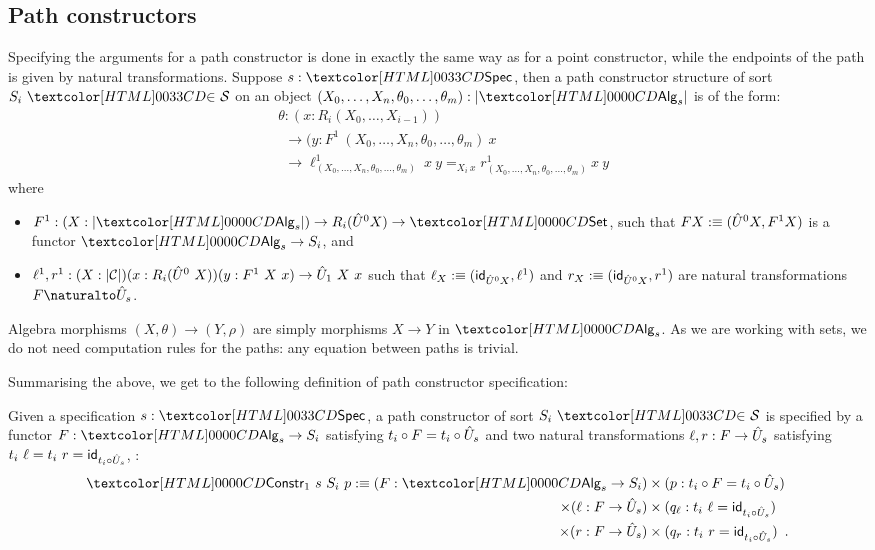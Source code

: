 \subsection{Path constructors}
\label{path-constructors}

Specifying the arguments for a path constructor is done in exactly the
same way as for a point constructor, while the endpoints of the path
is given by natural transformations. Suppose $s : \specty$, then a path
constructor structure of sort $\sortsin{S_i}{\Ss}$ on an object
$(X_0, \hdots, X_n, \theta_0,\hdots,\theta_m) : | \Alg_s |$ is of the
form:
\begin{align*}
  &\theta : (x : R_i (X_0, \hdots, X_{i-1})) \\
  &\ \ \to (y : F^1\ (X_0, \hdots, X_n, \theta_0, \hdots, \theta_m)\ x \\
  &\ \ \to \ell^1_{(X_0,\hdots,X_n,\theta_0,\hdots,\theta_m)}\ x\ y =_{X_i\ x} r^1_{(X_0,\hdots,X_n,\theta_0,\hdots,\theta_m)}\ x\ y 
\end{align*}
where
\begin{itemize}
\item $F^1 : (X : | \Alg_s |) \to R_i (\extendfunc{U}^0 X) \to \Set$, such
  that $F X :\equiv (\hat{U}^0 X, F^1 X)$ is a functor $\Alg_s \to S_i$, and
\item
  $\ell^1, r^1 : (X : | \mathcal{C} |) (x : R_i (\hat{U}^0\ X)) (y : F^1\ X\ x)
  \to \hat{U}_1\ X\ x$
  such that $\ell_X \ddefeq (\id_{\extendfunc{U}^0 X}, \ell^1)$ and
  $r_X \ddefeq (\id_{\extendfunc{U}^0 X}, r^1)$ are natural transformations
  $\Nat{F}{\extendfunc{U}_s}$.
\end{itemize}
Algebra morphisms $(X,\theta) \to (Y,\rho)$ are simply morphisms
$X \to Y$ in $\Alg_s$. As we are working with sets, we do not need
computation rules for the paths: any equation between paths is
trivial.

Summarising the above, we get to the following definition of
path constructor specification:

\begin{definition}
  Given a specification $s : \specty$, a path constructor of sort
  $\sortsin{S_i}{\Ss}$ is specified by a functor $F : \Alg_s \to S_i$
  satisfying $t_i \circ F = t_i \circ \hat{U}_s$ and two natural
  transformations $\ell, r : F \to \hat{U}_s$ satisfying
  $t_i\ \ell = t_i\ r = \id_{t_i \circ \extendfunc{U}_s}$, \ie:
\begin{align*}
  \Constr_1\ s\ S_i\ p \ddefeq (F : \Alg_s \to S_i) &\times (p : t_i \circ F = t_i \circ \extendfunc{U}_s) \\ 
  \times (\ell : F \to \extendfunc{U}_s) &\times (q_\ell : t_i\ \ell = \id_{t_i \circ \extendfunc{U}_s}) \\ 
  \times (r : F \to \extendfunc{U}_s) &\times (q_r : t_i\ r = \id_{t_i \circ \extendfunc{U}_s}) \enspace .
\end{align*}
\end{definition}

